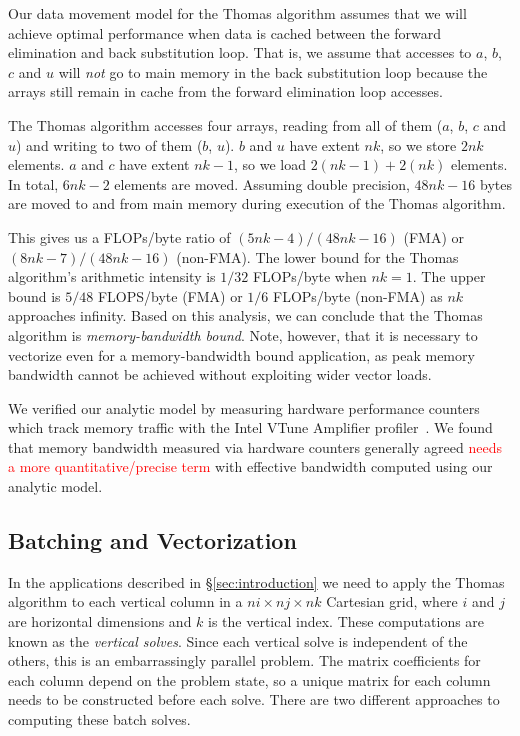 \documentclass{sig-alternate-05-2015}
\newcommand{\fix}[1]{\textcolor{red}{#1}}
\begin{document}
Our data movement model for the Thomas algorithm assumes that we will achieve
  optimal performance when data is cached between the forward elimination and
  back substitution loop.
That is, we assume that accesses to \(a\), \(b\), \(c\) and \(u\) will
  \emph{not} go to main memory in the back substitution loop because the arrays
  still remain in cache from the forward elimination loop accesses.

The Thomas algorithm accesses four arrays, reading from all of them (\(a\),
  \(b\), \(c\) and \(u\)) and writing to two of them (\(b\), \(u\)).
\(b\) and \(u\) have extent \(nk\), so we store \(2nk\) elements.
\(a\) and \(c\) have extent \(nk-1\), so we load \(2(nk-1)+2(nk)\) elements.
In total, \(6nk-2\) elements are moved.
Assuming double precision, \(48nk-16\) bytes are moved to and from main memory
  during execution of the Thomas algorithm.

This gives us a FLOPs/byte ratio of \((5nk-4)/(48nk-16)\) (FMA) or
  \((8nk-7)/(48nk-16)\) (non-FMA).
The lower bound for the Thomas algorithm's arithmetic intensity is \(1/32\)
  FLOPs/byte when \(nk=1\). 
The upper bound is \(5/48\) FLOPS/byte (FMA) or \(1/6\) FLOPs/byte (non-FMA) as
  \(nk\) approaches infinity.
Based on this analysis, we can conclude that the Thomas algorithm is
  \emph{memory-bandwidth bound}.
Note, however, that it is necessary to vectorize even for a memory-bandwidth bound
  application, as peak memory bandwidth cannot be achieved without exploiting
  wider vector loads.

We verified our analytic model by measuring hardware performance counters which
  track memory traffic with the Intel VTune Amplifier
  profiler~\cite{intel_vtune_amplifier}.
We found that memory bandwidth measured via hardware counters generally agreed \fix{needs a more quantitative/precise term}
  with effective bandwidth computed using our analytic model.

\subsection{Batching and Vectorization}
\label{sec:implementation:batching_and_parallelism}

In the applications described in \S\ref{sec:introduction} we need to apply the
  Thomas algorithm to each vertical column in a \(ni \times nj \times nk\)
  Cartesian grid, where \(i\) and \(j\) are horizontal dimensions and \(k\) is
  the vertical index.
These computations are known as the \emph{vertical solves}.
Since each vertical solve is independent of the others, this is an
  embarrassingly parallel problem.
The matrix coefficients for each column depend on the problem state, so a
  unique matrix for each column needs to be constructed before each solve.
There are two different approaches to computing these batch solves.
\end{document}
